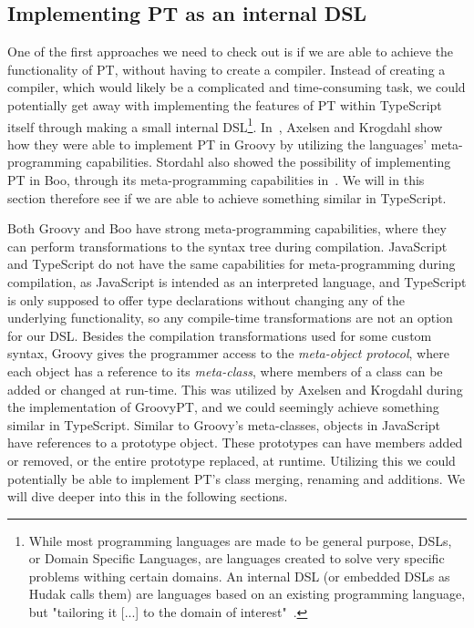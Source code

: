 \subsection{Implementing PT as an internal DSL}\label{subsec:implementing-pt-as-a-ts-library}


One of the first approaches we need to check out is if we are able to achieve the functionality of PT, without having to create a compiler.
Instead of creating a compiler, which would likely be a complicated and time-consuming task, we could potentially get away with implementing the features of PT within TypeScript itself through making a small internal DSL\footnote{While most programming languages are made to be general purpose, DSLs, or Domain Specific Languages, are languages created to solve very specific problems withing certain domains. An internal DSL (or embedded DSLs as Hudak calls them) are languages based on an existing programming language, but "tailoring it [...] to the domain of interest"~\cite{Hudak1997}.}.
In~\cite{groovypt}, Axelsen and Krogdahl show how they were able to implement PT in Groovy by utilizing the languages' meta-programming capabilities.
Stordahl also showed the possibility of implementing PT in Boo, through its meta-programming capabilities in~\cite{Stordahl2011}.
We will in this section therefore see if we are able to achieve something similar in TypeScript.

Both Groovy and Boo have strong meta-programming capabilities, where they can perform transformations to the syntax tree during compilation.
JavaScript and TypeScript do not have the same capabilities for meta-programming during compilation, as JavaScript is intended as an interpreted language, and TypeScript is only supposed to offer type declarations without changing any of the underlying functionality, so any compile-time transformations are not an option for our DSL\@.
Besides the compilation transformations used for some custom syntax, Groovy gives the programmer access to the \emph{meta-object protocol}, where each object has a reference to its \emph{meta-class}, where members of a class can be added or changed at run-time.
This was utilized by Axelsen and Krogdahl during the implementation of GroovyPT, and we could seemingly achieve something similar in TypeScript.
Similar to Groovy's meta-classes, objects in JavaScript have references to a prototype object.
These prototypes can have members added or removed, or the entire prototype replaced, at runtime.
Utilizing this we could potentially be able to implement PT's class merging, renaming and additions.
We will dive deeper into this in the following sections.


